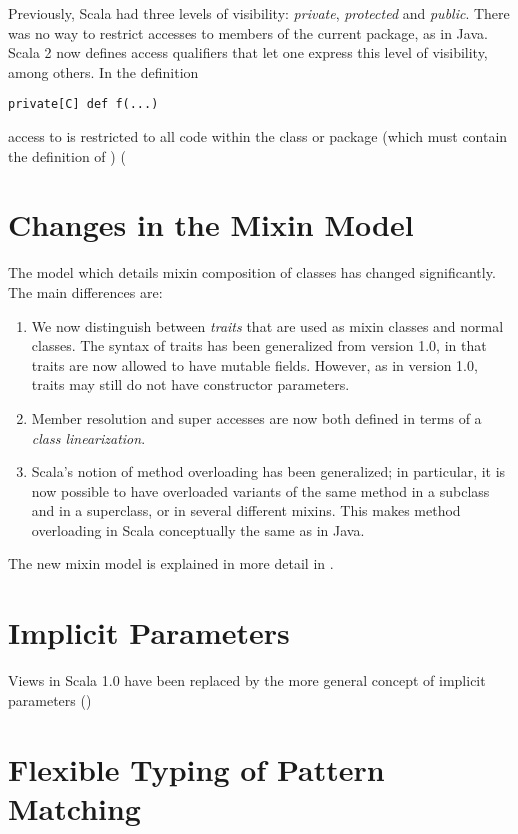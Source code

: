 Previously, Scala had three levels of visibility: {\em private},
{\em protected} and {\em public}. There was no way to
restrict accesses to members of the current package, as in Java. Scala
2 now defines access qualifiers that let one express this level of
visibility, among others. In the definition
\begin{lstlisting}
private[C] def f(...)
\end{lstlisting}
access to \lstinline@f@ is restricted to all code within the class or
package \lstinline@C@ (which must contain the definition of
\lstinline@f@) (

\section{Changes in the Mixin Model}\label{sec:mixin-classes}

The model which details mixin composition of classes has changed
significantly. The main differences are:
\begin{enumerate}
\item
We now distinguish between {\em traits} that are used as mixin classes
and normal classes. The syntax of traits has been generalized from
version 1.0, in that traits are now allowed to have mutable
fields. However, as in version 1.0, traits may still do not have
constructor parameters.
\item
Member resolution and super accesses are now both defined in terms of
a {\em class linearization}. 
\item
Scala's notion of method overloading has been generalized; in
 particular, it is now possible to have overloaded variants of the
 same method in a subclass and in a superclass, or in several different
 mixins. This makes method overloading in Scala conceptually the
 same as in Java.
\end{enumerate}
The new mixin model is explained in more detail in
.

\section{Implicit Parameters}

Views in Scala 1.0 have been replaced by the more general concept of
implicit parameters ()

\section{Flexible Typing of Pattern Matching}

